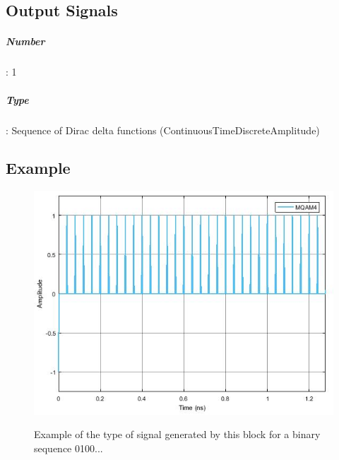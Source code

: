 \subsection*{Output Signals}

\subparagraph*{Number}: 1

\subparagraph*{Type}: Sequence of Dirac delta functions (ContinuousTimeDiscreteAmplitude)

\subsection*{Example}

\begin{figure}[h]
	\centering
	\includegraphics[width=\textwidth]{../m_qam_transmitter/figures/TimeDiscreteToContinuous_output}
	\label{MQAM4_DeterministicAppendZeros}\caption{Example of the type of signal generated by this block for a binary sequence 0100...}
\end{figure}


\pagebreak
